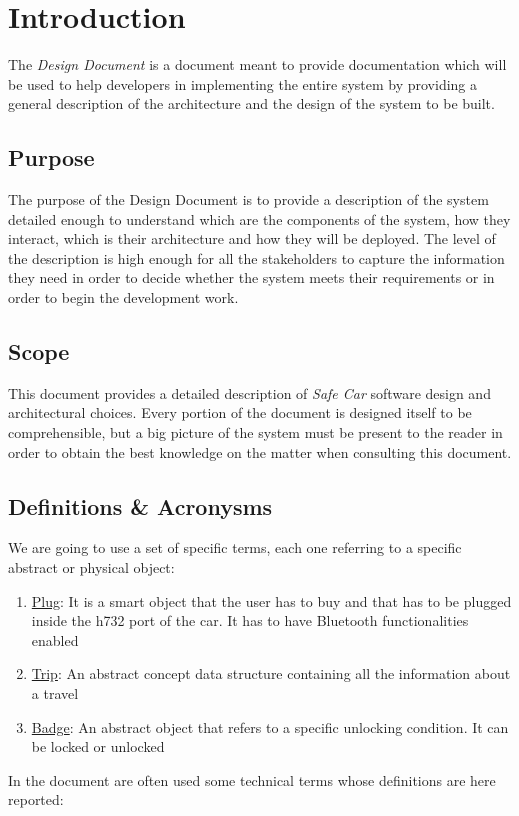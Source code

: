 \chapter{Introduction} \label{chap1}
The \textit{Design Document} is a document meant to provide documentation which will be used to help developers in implementing the entire system by providing a general description of the architecture and the design of the system to be built.

\section{Purpose}
The purpose of the Design Document is to provide a description of the system detailed enough to understand which are the components of the system, how they interact, which is their architecture and how they will be deployed. The level of the description is high enough for all the stakeholders to capture the information they need in order to decide whether the system meets their requirements or in order to begin the development work.

\section{Scope}
This document provides a detailed description of \textit{Safe Car} software design and architectural choices. Every portion of the document is designed itself to be comprehensible, but a big picture of the system must be present to the reader in order to obtain the best knowledge on the matter when consulting this document.

\section{Definitions \& Acronysms}
We are going to use a set of specific terms, each one referring to a specific abstract or physical object:

\begin{enumerate}
	\item \underline{Plug}: It is a smart object that the user has to buy and that has to be plugged inside the h732 port of the car. It has to have Bluetooth functionalities enabled
	\item \underline{Trip}: An abstract concept data structure containing all the information about a travel
	\item \underline{Badge}: An abstract object that refers to a specific unlocking condition. It can be locked or unlocked
\end{enumerate}
In the document are often used some technical terms whose definitions are here reported:

